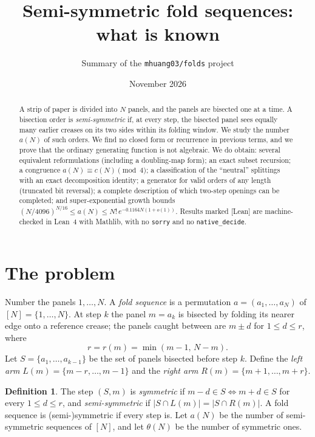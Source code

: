 \documentclass[11pt]{article}
\title{Semi-symmetric fold sequences: what is known}
\author{Summary of the \texttt{mhuang03/folds} project}
\date{November 2026}
\theoremstyle{definition}
\newtheorem{definition}[theorem]{Definition}
\theoremstyle{remark}
\begin{document}
\maketitle

\begin{abstract}
A strip of paper is divided into $N$ panels, and the panels are bisected one at a
time. A bisection order is \emph{semi-symmetric} if, at every step, the bisected panel
sees equally many earlier creases on its two sides within its folding window. We
study the number $a(N)$ of such orders. We find no closed form or recurrence in
previous terms, and we prove that the ordinary generating function is not algebraic.
We do obtain: several equivalent reformulations (including a doubling-map form); an
exact subset recursion; a congruence $a(N)\equiv c(N)\pmod 4$; a classification of
the ``neutral'' splittings with an exact decomposition identity; a generator for valid
orders of any length (truncated bit reversal); a complete description of which
two-step openings can be completed; and super-exponential growth bounds
$(N/4096)^{N/16}\le a(N)\le N!\,e^{-0.1164N(1+o(1))}$. Results marked
\textsf{[Lean]} are machine-checked in Lean~4 with Mathlib, with no \texttt{sorry}
and no \texttt{native\_decide}.
\end{abstract}

\section{The problem}

Number the panels $1,\dots,N$. A \emph{fold sequence} is a permutation
$a=(a_1,\dots,a_N)$ of $[N]=\{1,\dots,N\}$. At step $k$ the panel $m=a_k$ is bisected
by folding its nearer edge onto a reference crease; the panels caught between are
$m\pm d$ for $1\le d\le r$, where
\[
  r = r(m) = \min(m-1,\,N-m).
\]
Let $S=\{a_1,\dots,a_{k-1}\}$ be the set of panels bisected before step $k$. Define the
\emph{left arm} $L(m)=\{m-r,\dots,m-1\}$ and the \emph{right arm}
$R(m)=\{m+1,\dots,m+r\}$.

\begin{definition}
The step $(S,m)$ is \emph{symmetric} if $m-d\in S \iff m+d\in S$ for every
$1\le d\le r$, and \emph{semi-symmetric} if $|S\cap L(m)| = |S\cap R(m)|$. A fold
sequence is (semi-)symmetric if every step is. Let $a(N)$ be the number of
semi-symmetric sequences of $[N]$, and let $\theta(N)$ be the number of symmetric ones.
\end{definition}
\end{document}
